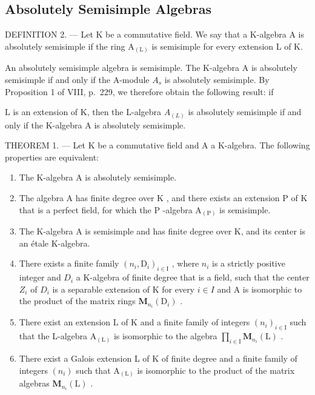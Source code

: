 \subsection{Absolutely Semisimple Algebras}

DEFINITION 2. --- Let K be a commutative field. We say that a K-algebra A is absolutely semisimple if the ring \(\mathrm{A}_{(\mathrm{L})}\) is semisimple for every extension L of K.

An absolutely semisimple algebra is semisimple. The K-algebra A is absolutely semisimple if and only if the A-module \(A_{s}\) is absolutely semisimple. By Proposition 1 of VIII, p.~229, we therefore obtain the following result: if

L is an extension of K, then the L-algebra \(A_{(L)}\) is absolutely semisimple if and only if the K-algebra A is absolutely semisimple.

THEOREM 1. --- Let K be a commutative field and A a K-algebra. The following properties are equivalent:

\begin{enumerate}
\def\labelenumi{(\roman{enumi})}
\item
  The K-algebra A is absolutely semisimple.
\item
  The algebra \(\mathrm{A}\) has finite degree over \(\mathrm{K}\) , and there exists an extension \(\mathrm{P}\) of \(\mathrm{K}\) that is a perfect field, for which the \(\mathrm{P}\) -algebra \(\mathrm{A}_{(\mathrm{P})}\) is semisimple.
\item
  The K-algebra A is semisimple and has finite degree over K, and its center is an étale K-algebra.
\item
  There exists a finite family \((n_{i},\mathrm{D}_{i})_{i\in\mathrm{I}}\) , where \(n_{i}\) is a strictly positive integer and \(D_{i}\) a K-algebra of finite degree that is a field, such that the center \(Z_{i}\) of \(D_{i}\) is a separable extension of K for every \(i\in I\) and A is isomorphic to the product of the matrix rings \(\mathbf{M}_{n_{i}}(\mathrm{D}_{i})\) .
\item
  There exist an extension \(\mathrm{L}\) of \(\mathrm{K}\) and a finite family of integers \((n_i)_{i\in \mathrm{I}}\) such that the L-algebra \(\mathrm{A}_{(\mathrm{L})}\) is isomorphic to the algebra \(\prod_{i\in \mathrm{I}}\mathbf{M}_{n_i}(\mathrm{L})\) .
\item
  There exist a Galois extension L of K of finite degree and a finite family of integers \((n_{i})\) such that \(\mathrm{A}_{(\mathrm{L})}\) is isomorphic to the product of the matrix algebras \(\mathbf{M}_{n_{i}}(\mathrm{L})\) .
\end{enumerate}

